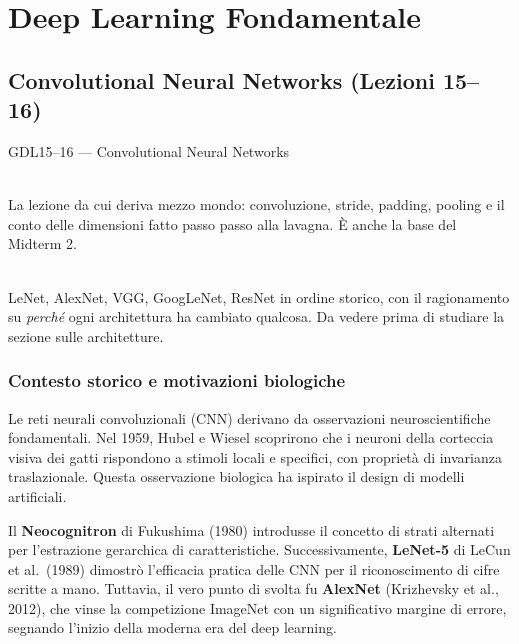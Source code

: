\part{Deep Learning Fondamentale}

\chapter{Convolutional Neural Networks (Lezioni 15--16)}

\begin{risorsevideo}{GDL15--16 — Convolutional Neural Networks}

\medskip
{}\\
La lezione da cui deriva mezzo mondo: convoluzione, stride, padding, pooling e il conto delle dimensioni fatto passo passo alla lavagna. È anche la base del Midterm 2.

\medskip
{}\\
LeNet, AlexNet, VGG, GoogLeNet, ResNet in ordine storico, con il ragionamento su \emph{perché} ogni architettura ha cambiato qualcosa. Da vedere prima di studiare la sezione sulle architetture.
\end{risorsevideo}

\section{Contesto storico e motivazioni biologiche}

Le reti neurali convoluzionali (CNN) derivano da osservazioni neuroscientifiche fondamentali. Nel 1959, Hubel e Wiesel scoprirono che i neuroni della corteccia visiva dei gatti rispondono a stimoli locali e specifici, con proprietà di invarianza traslazionale. Questa osservazione biologica ha ispirato il design di modelli artificiali.

Il \textbf{Neocognitron} di Fukushima (1980) introdusse il concetto di strati alternati per l'estrazione gerarchica di caratteristiche. Successivamente, \textbf{LeNet-5} di LeCun et al.\ (1989) dimostrò l'efficacia pratica delle CNN per il riconoscimento di cifre scritte a mano. Tuttavia, il vero punto di svolta fu \textbf{AlexNet} (Krizhevsky et al., 2012), che vinse la competizione ImageNet con un significativo margine di errore, segnando l'inizio della moderna era del deep learning.

